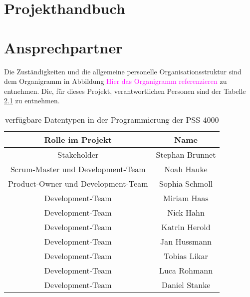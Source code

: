 
\chapter{Projekthandbuch}

\chapter{Ansprechpartner}
Die Zuständigkeiten und die allgemeine personelle Organisationsstruktur sind dem Organigramm in Abbildung \textcolor{magenta}{Hier das Organigramm referenzieren} zu entnehmen.
Die, für dieses Projekt, verantwortlichen Personen sind der Tabelle \ref{tab:Ansprechpartner} zu entnehmen.

\begin{table} [H]
\centering
\begin{tabular} {|c|c|} 
\hline
Rolle im Projekt & Name \\
\hline
Stakeholder & Stephan Brunnet  \\
\hline
Scrum-Master und Development-Team & Noah Hauke \\
\hline
Product-Owner und Development-Team & Sophia Schmoll \\
\hline
Development-Team & Miriam Haas \\
\hline
Development-Team & Nick Hahn \\
\hline
Development-Team & Katrin Herold \\
\hline
Development-Team & Jan Hussmann \\
\hline
Development-Team & Tobias Likar \\
\hline
Development-Team & Luca Rohmann \\
\hline
Development-Team & Daniel Stanke \\
\hline
\end{tabular}
\caption{verfügbare Datentypen in der Programmierung der PSS 4000}
\label{tab:Ansprechpartner}
\end{table}
